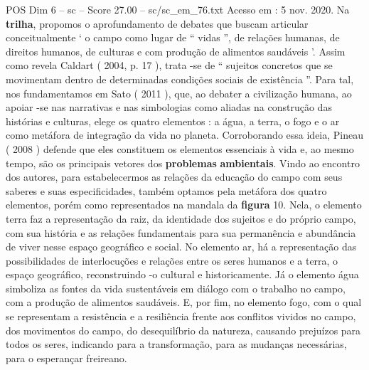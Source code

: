 \begin{textsample}{POS Dim 6 – sc – Score 27.00 – sc/sc\_em\_76.txt}
Acesso em : 5 nov. 2020.
Na \textbf{trilha}, propomos o aprofundamento de debates que buscam articular conceitualmente ‘ o campo como lugar de “ vidas ”, de relações humanas, de direitos humanos, de culturas e com produção de alimentos saudáveis ’.
Assim como revela Caldart ( 2004, p. 17 ), trata -se de “ sujeitos concretos que se movimentam dentro de determinadas condições sociais de existência ”.
Para tal, nos fundamentamos em Sato ( 2011 ), que, ao debater a civilização humana, ao apoiar -se nas narrativas e nas simbologias como aliadas na construção das histórias e culturas, elege os quatro elementos : a água, a terra, o fogo e o ar como metáfora de integração da vida no planeta.
Corroborando essa ideia, Pineau ( 2008 ) defende que eles constituem os elementos essenciais à vida e, ao mesmo tempo, são os principais vetores dos \textbf{problemas} \textbf{ambientais}.
Vindo ao encontro dos autores, para estabelecermos as relações da educação do campo com seus saberes e suas especificidades, também optamos pela metáfora dos quatro elementos, porém como representados na mandala da \textbf{figura} 10.
Nela, o elemento terra faz a representação da raiz, da identidade dos sujeitos e do próprio campo, com sua história e as relações fundamentais para sua permanência e abundância de viver nesse espaço geográfico e social.
No elemento ar, há a representação das possibilidades de interlocuções e relações entre os seres humanos e a terra, o espaço geográfico, reconstruindo -o cultural e historicamente.
Já o elemento água simboliza as fontes da vida sustentáveis em diálogo com o trabalho no campo, com a produção de alimentos saudáveis.
E, por fim, no elemento fogo, com o qual se representam a resistência e a resiliência frente aos conflitos vividos no campo, dos movimentos do campo, do desequilíbrio da natureza, causando prejuízos para todos os seres, indicando para a transformação, para as mudanças necessárias, para o esperançar freireano.

\end{textsample}
